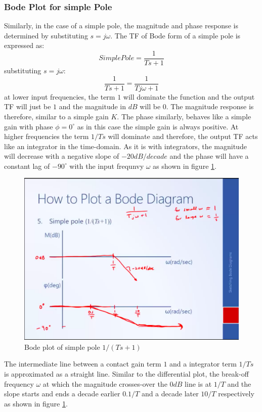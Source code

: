 \subsubsection{Bode Plot for simple Pole} \label{Sec_BodePlotSimplePole}

Similarly, in the case of a simple pole, the magnitude and phase response is determined by substituting $s = j \omega$. The TF of Bode form of a simple pole is expressed as:
\begin{equation}
	Simple Pole = \frac{1}{Ts + 1}
\end{equation}
substituting $s = j \omega$:
\begin{equation}
	\frac{1}{Ts + 1} = \frac{1}{T j \omega + 1}
\end{equation}
at lower input frequencies, the term $1$ will dominate the function and the output TF will just be $1$ and the magnitude in $dB$ will be $0$. The magnitude response is therefore, similar to a simple gain $K$. The phase similarly, behaves like a simple gain with phase $\phi = 0^{\circ}$ as in this case the simple gain is always positive. At higher frequencies the term $1/Ts$ will dominate and therefore, the output TF acts like an integrator in the time-domain. As it is with integrators, the magnitude will decrease with a negative slope of $- 20 dB/decade$ and the phase will have a constant lag of $-90^{\circ}$ with the input frequnvy $\omega$ as shown in figure \ref{Fig_FreqResp_BodePlot_pole}.
\begin{figure}[h!]
	\centering
	\includegraphics[width=\linewidth]{Bilder/FreqResp_BodePlot_pole}
	\caption{Bode plot of simple pole $1/(Ts + 1)$}
	\label{Fig_FreqResp_BodePlot_pole}
\end{figure}
The intermediate line between a contact gain term $1$ and a integrator term $1/Ts$ is approximated as a straight line. Similar to the differential plot, the break-off frequency $\omega$ at which the magnitude crosses-over the $0 dB$ line is at $1/T$ and the slope starts and ends a decade earlier $0.1/T$ and a decade later $10/T$ respectively as shown in figure \ref{Fig_FreqResp_BodePlot_pole}.

